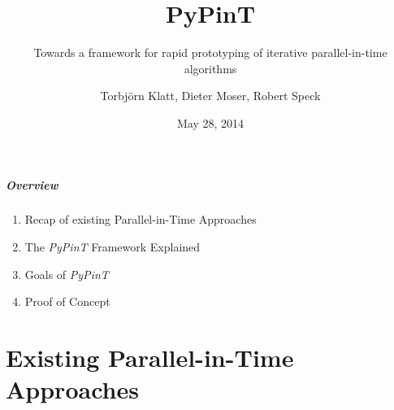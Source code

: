 \documentclass[%
  english,
  hyperref={pdfpagelabels=false},
  aspectratio=1610]{beamer}
\title{PyPinT}
\subtitle{Towards a framework for rapid prototyping of iterative parallel-in-time algorithms}
\author{Torbjörn Klatt, Dieter Moser, Robert Speck}
\institute{3rd Workshop on Parallel-in-Time Integration}
\date{May 28, 2014}
\begin{document}
\maketitle

\begin{frame}
  \frametitle{Overview}
  \begin{enumerate}
    \item Recap of existing Parallel-in-Time Approaches\\[2em]
    \item The \emph{PyPinT} Framework Explained\\[2em]
    \item Goals of \emph{PyPinT}\\[2em]
    \item Proof of Concept
  \end{enumerate}
\end{frame}


\part{Existing Parallel-in-Time Approaches}
\makepart
\end{document}
